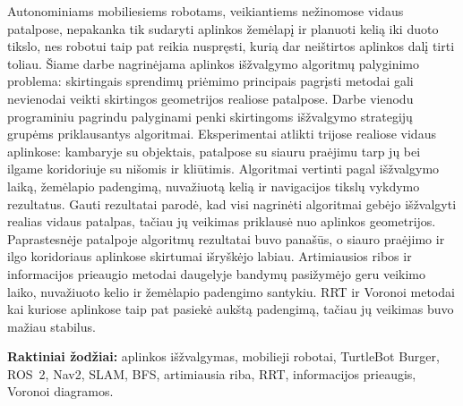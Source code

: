 \documentclass[]{VUMIFTemplateClass}
\begin{document}

\onehalfspacing


\singlespacing

\tableofcontents
\onehalfspacing


Autonominiams mobiliesiems robotams, veikiantiems nežinomose vidaus patalpose, nepakanka tik sudaryti aplinkos žemėlapį ir planuoti kelią iki duoto tikslo,
nes robotui taip pat reikia nuspręsti, kurią dar neištirtos aplinkos dalį tirti toliau. Šiame darbe nagrinėjama aplinkos išžvalgymo algoritmų palyginimo
problema: skirtingais sprendimų priėmimo principais pagrįsti metodai gali nevienodai veikti skirtingos geometrijos realiose patalpose. Darbe vienodu
programiniu pagrindu palyginami penki skirtingoms išžvalgymo strategijų grupėms priklausantys algoritmai. Eksperimentai atlikti trijose realiose vidaus
aplinkose: kambaryje su objektais, patalpose su siauru praėjimu tarp jų bei ilgame koridoriuje su nišomis ir kliūtimis. Algoritmai vertinti pagal
išžvalgymo laiką, žemėlapio padengimą, nuvažiuotą kelią ir navigacijos tikslų vykdymo rezultatus. Gauti rezultatai parodė, kad visi nagrinėti algoritmai
gebėjo išžvalgyti realias vidaus patalpas, tačiau jų veikimas priklausė nuo aplinkos geometrijos. Paprastesnėje patalpoje algoritmų rezultatai buvo panašūs, o
siauro praėjimo ir ilgo koridoriaus aplinkose skirtumai išryškėjo labiau. Artimiausios ribos ir informacijos prieaugio metodai daugelyje bandymų pasižymėjo
geru veikimo laiko, nuvažiuoto kelio ir žemėlapio padengimo santykiu. RRT ir Voronoi metodai kai kuriose aplinkose taip pat pasiekė aukštą padengimą, tačiau
jų veikimas buvo mažiau stabilus.

\textbf{Raktiniai žodžiai:} aplinkos išžvalgymas, mobilieji robotai, TurtleBot Burger, ROS~2, Nav2, SLAM, BFS, artimiausia riba, RRT, informacijos prieaugis, Voronoi diagramos.

\end{document}
